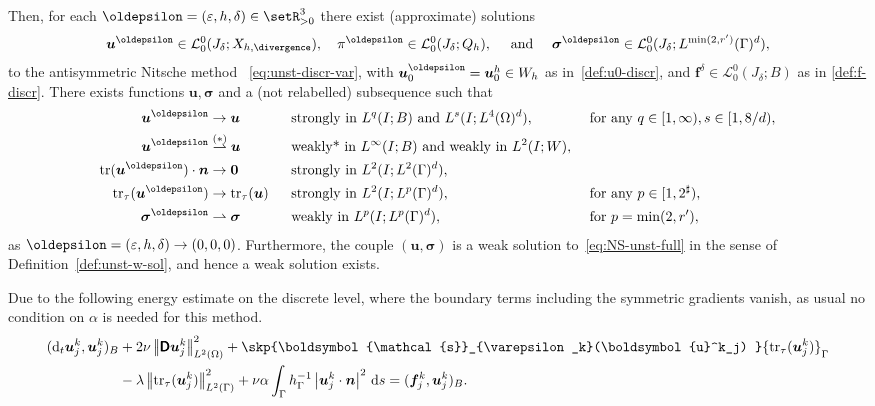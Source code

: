 \documentclass[reqno,a4paper]{amsart}
\def\abs#1{\left| #1 \right|}
\def\norm#1{\left|\!\left| #1 \right|\!\right|}
\def\tens#1{\pmb{\mathsf{#1}}}
\def\vec#1{\boldsymbol{#1}}
\def\tr{\mathop{\mathrm{tr}}\nolimits}
\def\d{{\rm d}}
\def\ds{\,\d s}
\def\difft{\d_t}
\def\Du{\BD\bu}
\def\wconv{\rightharpoonup}
\def\Bh{{W_h}}
\def\b0{\vec{0}}
\def\bf{\vec{f}}
\def\bn{\vec{n}}
\def\bu{\vec{u}}
\def\bsigma{\vec{\sigma}}
\def\BD{\tens{D}}
\def\Srel{\vec{\mathcal{s}}}
\def\discr{\oldepsilon}
\begin{document}
\begin{theorem}
		Then, for each $\oldepsilon = (\varepsilon, h,\delta)\in \setR^{3}_{>0}$ there exist (approximate) solutions
		\begin{align}
			\bu^{\oldepsilon} \in \mathcal{L}^0_0(J_{\delta};X_{h,\divergence}), 
			\quad 
			\pi^{\oldepsilon} \in \mathcal{L}^0_0(J_{\delta};Q_{h}),
			\quad \text{ and } \quad  
			\bsigma^\discr 
			\in \mathcal{L}^0_0(J_{\delta};L^{\min(2,r')}(\Gamma)^d),
		\end{align}
		to the antisymmetric Nitsche method
		~\eqref{eq:unst-discr-var}, with $ \bu^\oldepsilon_0 = \bu_0^h \in \Bh$ as in~\eqref{def:u0-discr}, and $\bf^\delta \in \mathcal{L}^0_0(J_{\delta};B)$ as in \eqref{def:f-discr}. 
		There exists functions $\bu, \bsigma$ and a (not relabelled) subsequence such that 
			\begin{alignat*}{5}
				\bu^\oldepsilon 
				&\to  \bu \;\; 
				&&\text{ strongly in } L^q(I;B) \text{ and } L^{s}(I;L^4(\Omega)^d), &&\text{ for any } q \in [1,\infty), s \in [1,8/d),
				\\
				\bu^\oldepsilon 
				&\overset{(*)}{\rightharpoonup}  \bu \;\; 
				&&\text{ weakly* in } L^\infty(I;B) \text{ and weakly in } L^2(I;W),\\
				\tr (\bu^\oldepsilon) \cdot \bn &\to \b0 \qquad &&\text{ strongly in } L^2(I;L^2(\Gamma)^d), \\
				\tr_\tau (\bu^\oldepsilon) &\to \tr_\tau(\bu)  \;&&\text{ strongly in } L^{2}(I;L^{p}(\Gamma)^d),  \quad &&\text{ for any  } p \in [1, 2^\sharp),\\
				\bsigma^\discr &\wconv \bsigma \qquad &&\text{ weakly in } L^{p}(I;L^{p}(\Gamma)^d), && \text{ for } 	p = \min(2,r'),
			\end{alignat*}	
		as $\oldepsilon = (\varepsilon, h, \delta) \to (0,0,0)$. 
		Furthermore, the couple $(\bu, \bsigma)$ is a weak solution to~\eqref{eq:NS-unst-full} in the sense of Definition~\ref{def:unst-w-sol}, and hence a weak solution exists.  
	\end{theorem}
	
	Due to the following energy estimate on the discrete level, where the boundary terms including the symmetric gradients vanish, as usual no condition on $\alpha$ is needed for this method. 
	\begin{equation}\label{est:unst-ap-1-v}
		\begin{aligned}
			({\difft {\bu}^k_j},{\bu}^k_j)_B
			&+  2 \nu \norm{\Du^k_j}_{L^2(\Omega)}^2 
			+ \skp{\Srel_{\varepsilon_k}(\bu^k_j)
			}{\tr_{\tau}(\bu^k_j) }_{\Gamma}\\
			& 
			- \lambda  \norm{\tr_{\tau}(\bu^k_j) }_{L^2(\Gamma)}^2 
			+ \nu \alpha  \int_{\Gamma}h_{\Gamma}^{-1} \abs{\bu^k_j \cdot \bn}^2 \ds = ({\bf}_j^k,{\bu}^k_j)_B.
		\end{aligned}
	\end{equation}
	
\end{document}
